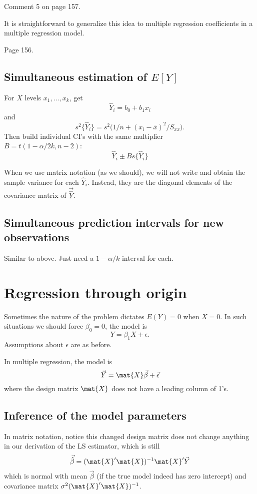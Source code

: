 \documentclass[12pt]{article}
\begin{document}
Comment 5 on page 157.

\alert[Generalization]%
It is straightforward to generalize this idea to
multiple regression coefficients in a multiple regression model.

\example Page 156.

\subsection{Simultaneous estimation of $E[Y]$}

For $X$ levels $x_1,\dotsc,x_k$,
get
\[
\hat{Y}_i = b_0 + b_1 x_i
\]
and
\[
s^2\{\hat{Y}_i\}
= s^2 \bigl(1/n + (x_i - \overline{x})^2/S_{xx}\bigr)
.
\]
Then build individual CI's with the same multiplier\\
$B = t(1 - \alpha/2k, n - 2)$:
\[
\hat{Y}_i \pm B s\{\hat{Y}_i\}
\]


\alert
When we use matrix notation (as we should),
we will not write and obtain the sample variance for each $\hat{Y}_i$.
Instead, they are the diagonal elements of the covariance matrix
of $\vec{\hat{Y}}$.

\subsection{Simultaneous prediction intervals for new observations}

Similar to above.
Just need a $1 - \alpha/k$ interval for each.


\section{Regression through origin}

Sometimes the nature of the problem dictates $E(Y) = 0$ when $X = 0$.
In such situations we should force $\beta_0 = 0$, \ie the model is
\[
Y = \beta_1 X + \epsilon
.
\]
Assumptions about $\epsilon$ are as before.

In multiple regression, the model is
\[
\vec{Y} = \mat{X} \vec{\beta} + \vec{\epsilon}
\]
where the design matrix $\mat{X}$ does not have a leading column of 1's.


\subsection{Inference of the model parameters}

In matrix notation, notice this changed design matrix
does not change anything in our derivation of the LS estimator,
which is still
\[
\vec{\hat\beta} = (\mat{X}'\mat{X})^{-1}\mat{X}' \vec{Y}
\]
which is normal
with mean $\vec\beta$ (if the true model indeed has zero intercept)
and covariance matrix $\sigma^2 (\mat{X}'\mat{X})^{-1}$.
\end{document}
